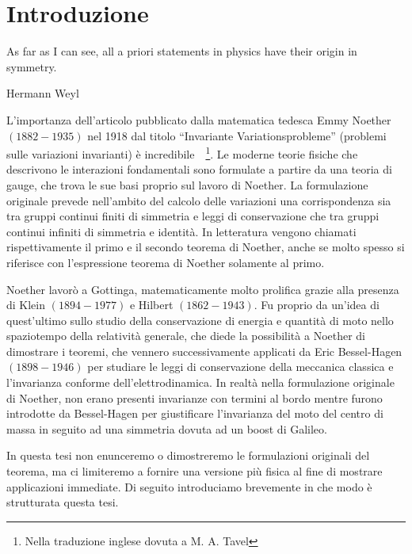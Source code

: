 \chapter{Introduzione}

    \epigraph{As far as I can see, all a priori statements in physics have their origin in symmetry.}{Hermann Weyl}

    L'importanza dell'articolo pubblicato dalla matematica tedesca Emmy Noether $(1882-1935)$ nel 1918 dal titolo ``Invariante Variationsprobleme'' (problemi sulle variazioni invarianti) è incredibile~\cite{noether}~\cite{noether2}\footnote{Nella traduzione inglese dovuta a M. A. Tavel}. Le moderne teorie fisiche che descrivono le interazioni fondamentali sono formulate a partire da una teoria di gauge, che trova le sue basi proprio sul lavoro di Noether. La formulazione originale prevede nell'ambito del calcolo delle variazioni una corrispondenza sia tra gruppi continui finiti di simmetria e leggi di conservazione che tra gruppi continui infiniti di simmetria e identità. In letteratura vengono chiamati rispettivamente il primo e il secondo teorema di Noether, anche se molto spesso si riferisce con l'espressione teorema di Noether solamente al primo. 
    
    Noether lavorò a Gottinga, matematicamente molto prolifica grazie alla presenza di Klein $(1894-1977)$ e Hilbert $(1862-1943)$. Fu proprio da un'idea di quest'ultimo sullo studio della conservazione di energia e quantità di moto nello spaziotempo della relatività generale, che diede la possibilità a Noether di dimostrare i teoremi, che vennero successivamente applicati da Eric Bessel-Hagen $(1898-1946)$ per studiare le leggi di conservazione della meccanica classica e l'invarianza conforme dell'elettrodinamica. In realtà nella formulazione originale di Noether, non erano presenti invarianze con termini al bordo mentre furono introdotte da Bessel-Hagen per giustificare l'invarianza del moto del centro di massa in seguito ad una simmetria dovuta ad un boost di Galileo.

    In questa tesi non enunceremo o dimostreremo le formulazioni originali del teorema, ma ci limiteremo a fornire una versione più fisica al fine di mostrare applicazioni immediate. Di seguito introduciamo brevemente in che modo è strutturata questa tesi.
    
